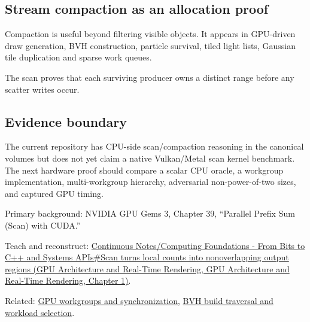 \subsection{Stream compaction as an allocation proof}\label{appendix-f2ee4d086415-stream-compaction-as-an-allocation-proof}

Compaction is useful beyond filtering visible objects. It appears in GPU-driven draw generation, BVH construction, particle survival, tiled light lists, Gaussian tile duplication and sparse work queues.

The scan proves that each surviving producer owns a distinct range before any scatter writes occur.

\subsection{Evidence boundary}\label{appendix-f2ee4d086415-evidence-boundary}

The current repository has CPU-side scan/compaction reasoning in the canonical volumes but does not yet claim a native Vulkan/Metal scan kernel benchmark. The next hardware proof should compare a scalar CPU oracle, a workgroup implementation, multi-workgroup hierarchy, adversarial non-power-of-two sizes, and captured GPU timing.

Primary background: NVIDIA GPU Gems 3, Chapter 39, ``Parallel Prefix Sum (Scan) with CUDA.''

Teach and reconstruct: \href{../06-GPU-Architecture-and-Real-Time-Rendering/main.pdf\#nameddest=01-foundations-i-ch008-scan-turns-local-counts-into-nonoverlapping-output-regions}{Continuous Notes/Computing Foundations - From Bits to C++ and Systems APIs\#Scan turns local counts into nonoverlapping output regions (GPU Architecture and Real-Time Rendering, GPU Architecture and Real-Time Rendering, Chapter 1)}.

Related: \hyperref[appendix-f662b5b1773b]{GPU workgroups and synchronization}, \hyperref[appendix-5653a7aea6bb]{BVH build traversal and workload selection}.
